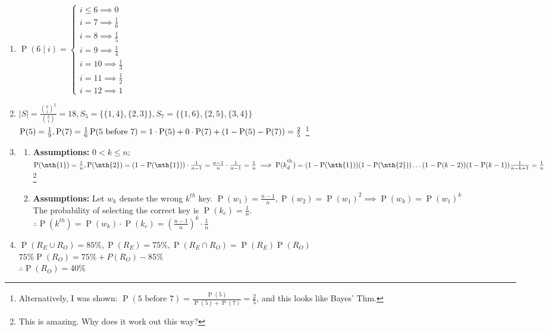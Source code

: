 \documentclass{article}
\newcommand{\set}[1]{\{#1\}}
\newcommand{\pr}[1]{\operatorname{P} (#1)}
\begin{document}
\begin{enumerate}
  \item
  $\pr{6 \mid i} = \begin{cases}
    i \leq 6 \implies 0\\
    i = 7 \implies \frac{1}{6}\\
    i = 8 \implies \frac{1}{5}\\
    i = 9 \implies \frac{1}{4}\\
    i = 10 \implies \frac{1}{3}\\
    i = 11 \implies \frac{1}{2}\\
    i = 12 \implies 1
  \end{cases}$
  
  \item $|S| = \frac{\binom{6}{1}^2}{\binom{2}{1}} = 18, S_5 = \set{\set{1,4}, \set{2,3}}, S_7 = \set{\set{1,6}, \set{2,5}, \set{3,4}}$\\
  $\pr{5} = \frac{1}{9}, \pr{7} = \frac{1}{6}\\
  \pr{5\text{ before }7} = 1\cdot \pr{5} + 0\cdot\pr{7} + (1 - \pr{5} - \pr{7}) = \frac{2}{5}$
  \footnote{  Alternatively, I was shown: $\pr{5\text{ before }7} = \frac{\pr{5}}{\pr{5} + \pr{7}} = \frac{2}{5}$, and this looks like Bayes' Thm.}
  \item \begin{enumerate}
    \item \textbf{Assumptions:} $0 < k \leq n$; 
    $\pr{\nth{1}} = \frac{1}{n}, 
    \pr{\nth{2}} 
    = (1 - \pr{\nth{1}})\cdot \frac{1}{n-1}
    = \frac{n-1}{n}\cdot \frac{1}{n - 1}
    = \frac{1}{n}\\ 
    \implies \pr{k_d^\textsuperscript{th}} = 
    (1 - \pr{\nth{1}})(1 - \pr{\nth{2}})\ldots(1 - \pr{k-2})(1 - \pr{k-1})\frac{1}{n - k + 1} = \frac{1}{n}$\footnote{This is amazing. Why does it work out this way?}
    \item \textbf{Assumptions:} Let $w_k$ denote the wrong $k^{th}$ key.
    $\pr{w_1} = \frac{n-1}{n}, \pr{w_2} = \pr{w_1}^2 \implies \pr{w_k} = \pr{w_1}^k$\\
    The probability of selecting the correct key is $\pr{k_c} = \frac{1}{n}$.\\
    $\therefore \pr{k^{th}} = \pr{w_k}\cdot \pr{k_c} = (\frac{n-1}{n})^k\cdot \frac{1}{n}$
  \end{enumerate}
  
  \item $\pr{R_E \cup R_O} = 85\%, \pr{R_E}= 75\%, \pr{R_E \cap R_O} = \pr{R_E}\pr{R_O}$\\
  $75\%\pr{R_O} = 75\% + P(R_O) - 85\%$\\
  $\therefore \pr{R_O} = 40\%$
  

\end{enumerate}
\end{document}
